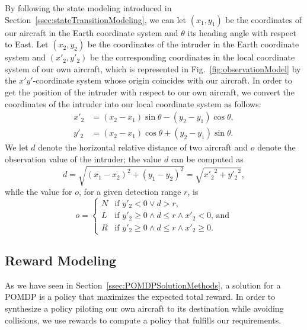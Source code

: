 \documentclass[orivec]{llncs}
\begin{document}
By following the state modeling introduced in Section~\ref{ssec:stateTransitionModeling}, we can let $(x_{1},y_{1})$ be the coordinates of our aircraft in the Earth coordinate system and $\theta$ its heading angle with respect to East.
Let $(x_{2},y_{2})$ be the coordinates of the intruder in the Earth coordinate system and $(x'_{2},y'_{2})$ be the corresponding coordinates in the local coordinate system of our own aircraft, which is represented in Fig.~\ref{fig:observationModel} by the $x'y'$-coordinate system whose origin coincides with our aircraft.
In order to get the position of the intruder with respect to our own aircraft, we convert the coordinates of the intruder into our local coordinate system as follows:
\begin{equation}
\label{eq:convert}
\begin{split}
    x'_{2} &= (x_{2}-x_{1}) \sin\theta - (y_{2}-y_{1}) \cos\theta,  \\
    y'_{2} &= (x_{2}-x_{1}) \cos\theta + (y_{2}-y_{1}) \sin\theta.
\end{split}
\end{equation}
We let $d$ denote the horizontal relative distance of two aircraft and $o$ denote the observation value of the intruder;
the value $d$ can be computed as
\begin{equation}
	\label{eq:distance}
    d = \sqrt{(x_{1}-x_{2})^{2} + (y_{1}-y_{2})^{2}} = \sqrt{{x'_{2}}^{2} + {y'_{2}}^{2}},
\end{equation}
while the value for $o$, for a given detection range $r$, is
\begin{equation} 
	o = 
	\begin{cases}
		N & \text{if $y'_{2} < 0 \lor d > r$,} \\
		L & \text{if $y'_{2} \geq 0 \land d \leq r \land x'_{2} < 0$, and} \\
		R & \text{if $y'_{2} \geq 0 \land d \leq r \land x'_{2} \geq 0$.}
	\end{cases}
\end{equation}


\subsection{Reward Modeling}
\label{ssec:rewardModeling}

As we have seen in Section~\ref{ssec:POMDPSolutionMethods}, a solution for a POMDP is a policy that maximizes the expected total reward.
In order to synthesize a policy piloting our own aircraft to its destination while avoiding collisions, we use rewards to compute a policy that fulfills our requirements.
\end{document}
